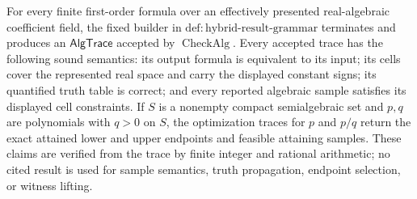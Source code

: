 For every finite first-order formula over an effectively presented real-algebraic coefficient field, the fixed builder in \(\mathrm{def:hybrid\text{-}result\text{-}grammar}\) terminates and produces an \(\mathsf{AlgTrace}\) accepted by \(\operatorname{CheckAlg}\).  Every accepted trace has the following sound semantics: its output formula is equivalent to its input; its cells cover the represented real space and carry the displayed constant signs; its quantified truth table is correct; and every reported algebraic sample satisfies its displayed cell constraints.  If \(S\) is a nonempty compact semialgebraic set and \(p,q\) are polynomials with \(q>0\) on \(S\), the optimization traces for \(p\) and \(p/q\) return the exact attained lower and upper endpoints and feasible attaining samples.  These claims are verified from the trace by finite integer and rational arithmetic; no cited result is used for sample semantics, truth propagation, endpoint selection, or witness lifting.